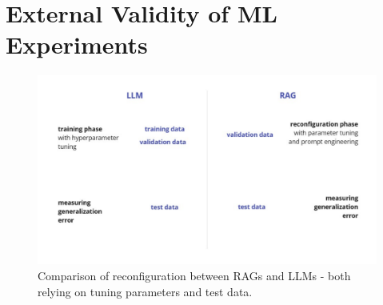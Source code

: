 






\section{External Validity of ML Experiments}

\begin{figure}
    \centering
    \includegraphics[width=\textwidth]{images/RAGvsLLM-tuning.pdf}
    \caption{Comparison of reconfiguration between RAGs and LLMs - both relying on tuning parameters and test data.}
    \label{fig:tuning}
\end{figure}


